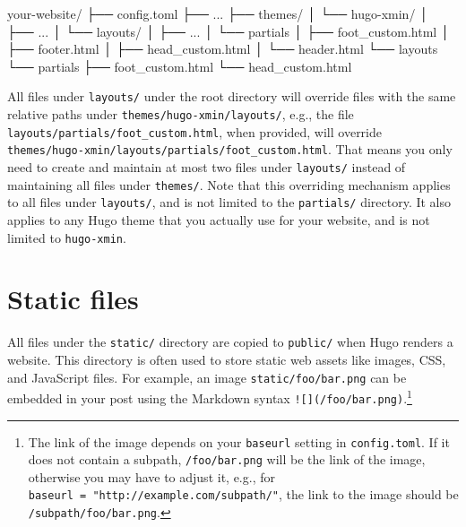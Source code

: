 \documentclass[12pt,]{krantz}
\makeatletter
\newenvironment{Shaded}{\begin{snugshade}}{\end{snugshade}}
\newcommand{\ExtensionTok}[1]{#1}
\newcommand{\NormalTok}[1]{#1}
\newenvironment{kframe}{%
\medskip{}
\setlength{\fboxsep}{.8em}
 \def\at@end@of@kframe{}%
 \ifinner\ifhmode%
  \def\at@end@of@kframe{\end{minipage}}%
  \begin{minipage}{\columnwidth}%
 \fi\fi%
 \def\FrameCommand##1{\hskip\@totalleftmargin \hskip-\fboxsep
 \colorbox{shadecolor}{##1}\hskip-\fboxsep
     \hskip-\linewidth \hskip-\@totalleftmargin \hskip\columnwidth}%
 \MakeFramed {\advance\hsize-\width
   \@totalleftmargin\z@ \linewidth\hsize
   \@setminipage}}%
 {\par\unskip\endMakeFramed%
 \at@end@of@kframe}
\renewenvironment{Shaded}{\begin{kframe}}{\end{kframe}}
\theoremstyle{definition}
\theoremstyle{definition}
\theoremstyle{definition}
\theoremstyle{remark}
\makeatother
\begin{document}
\begin{Shaded}
\begin{Highlighting}[]
\ExtensionTok{your-website/}
\NormalTok{├── }\ExtensionTok{config.toml}
\NormalTok{├── }\ExtensionTok{...}
\NormalTok{├── }\ExtensionTok{themes/}
\NormalTok{│   └── }\ExtensionTok{hugo-xmin/}
\NormalTok{│       ├── }\ExtensionTok{...}
\NormalTok{│       └── }\ExtensionTok{layouts/}
\NormalTok{│           ├── }\ExtensionTok{...}
\NormalTok{│           └── }\ExtensionTok{partials}
\NormalTok{│               ├── }\ExtensionTok{foot_custom.html}
\NormalTok{│               ├── }\ExtensionTok{footer.html}
\NormalTok{│               ├── }\ExtensionTok{head_custom.html}
\NormalTok{│               └── }\ExtensionTok{header.html}
\NormalTok{└── }\ExtensionTok{layouts}
\NormalTok{    └── }\ExtensionTok{partials}
\NormalTok{        ├── }\ExtensionTok{foot_custom.html}
\NormalTok{        └── }\ExtensionTok{head_custom.html}
\end{Highlighting}
\end{Shaded}

All files under \texttt{layouts/} under the root directory will override
files with the same relative paths under
\texttt{themes/hugo-xmin/layouts/}, e.g., the file
\texttt{layouts/partials/foot\_custom.html}, when provided, will
override \texttt{themes/hugo-xmin/layouts/partials/foot\_custom.html}.
That means you only need to create and maintain at most two files under
\texttt{layouts/} instead of maintaining all files under
\texttt{themes/}. Note that this overriding mechanism applies to all
files under \texttt{layouts/}, and is not limited to the
\texttt{partials/} directory. It also applies to any Hugo theme that you
actually use for your website, and is not limited to \texttt{hugo-xmin}.

\hypertarget{static-files}{%
\section{Static files}\label{static-files}}

All files under the \texttt{static/} directory
are copied to \texttt{public/} when Hugo renders a website. This
directory is often used to store static web assets like images, CSS, and
JavaScript files. For example, an image \texttt{static/foo/bar.png} can
be embedded in your post using the Markdown syntax
\texttt{!{[}{]}(/foo/bar.png)}.\footnote{The link of the image depends
  on your \texttt{baseurl} setting in \texttt{config.toml}. If it does
  not contain a subpath, \texttt{/foo/bar.png} will be the link of the
  image, otherwise you may have to adjust it, e.g., for
  \texttt{baseurl\ =\ "http://example.com/subpath/"}, the link to the
  image should be \texttt{/subpath/foo/bar.png}.}
\end{document}
